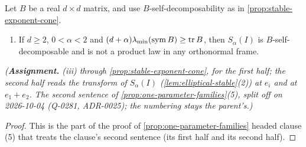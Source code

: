 \begin{proposition}
\label{prop:one-parameter-stable-member}
\leanok
Let $B$ be a real $d \times d$ matrix, and use $B$-self-decomposability as in
\ref{prop:stable-exponent-cone}.
\begin{enumerate}
\item[(5)] If $d \ge 2$, $0 < \alpha < 2$ and $(d+\alpha)\lambda_{\min}(\mathrm{sym}\,B) \ge \operatorname{tr} B$,
then $S_\alpha(I)$ is $B$-self-decomposable and is not a product law in any orthonormal frame.
\end{enumerate}
\statusA\quad{}\quad\emph{(\textbf{Assignment.} (iii) through
\ref{prop:stable-exponent-cone}, for the first half; the second half reads the transform of
$S_\alpha(I)$ (\ref{lem:elliptical-stable}(2)) at $e_i$ and at $e_1 + e_2$.
The second sentence of \ref{prop:one-parameter-families}(5), split off on 2026-10-04 (Q-0281,
ADR-0025); the numbering stays the parent's.)}
\end{proposition}

\begin{proof}
\leanok
This is the part of the proof of \ref{prop:one-parameter-families} headed clause (5) that treats
the clause's second sentence (its first half and its second half).
\end{proof}

